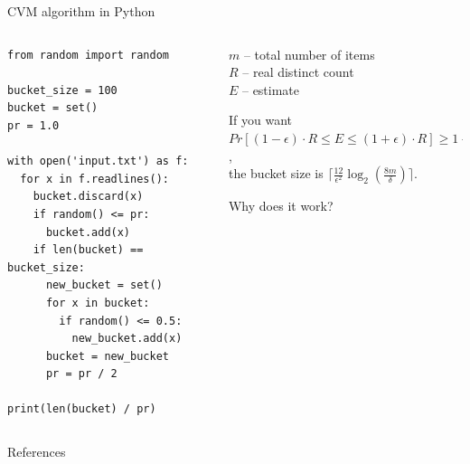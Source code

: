\documentclass[10pt]{beamer}
\begin{document}
\begin{frame}[fragile]{CVM algorithm in Python}
\begin{columns}[c,totalwidth=0.9\textwidth]
\begin{column}{0.52\textwidth}
\begin{verbatim}
from random import random

bucket_size = 100
bucket = set()
pr = 1.0

with open('input.txt') as f:
  for x in f.readlines():
    bucket.discard(x)
    if random() <= pr:
      bucket.add(x)
    if len(bucket) == bucket_size:
      new_bucket = set()
      for x in bucket:
        if random() <= 0.5:
          new_bucket.add(x)
      bucket = new_bucket
      pr = pr / 2

print(len(bucket) / pr)
\end{verbatim}
\end{column}
\begin{column}{0.48\textwidth}
{%
$m$ -- total number of items \\
$R$ -- real distinct count \\
$E$ -- estimate
\vspace{0.2cm}}

{%
If you want \\
$Pr[(1-\epsilon)\cdot R \leq E \leq (1+\epsilon)\cdot R] \geq 1-\delta$, \\
the bucket size is $\lceil\frac{12}{\epsilon^2}\log_2{(\frac{8m}{\delta})}\rceil$.
\vspace{2cm}}

\begin{center}
Why does it work? 
\end{center}
\end{column}
\end{columns}
\end{frame}

\begin{frame}{References}

\nocite{*}
  
  

\end{frame}
\end{document}
